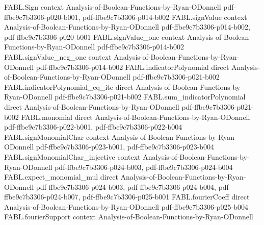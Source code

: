 \begin{theorem}
\label{FABL.variance_bounds_distanceToNearestConstant}
\leanok
{}
\proofstep
  {FABL.Sign}
  {context}
  {Analysis-of-Boolean-Functions-by-Ryan-ODonnell}
  {pdf-ffbe9c7b3306-p020-b001,
    pdf-ffbe9c7b3306-p014-b002}
\proofstep
  {FABL.signValue}
  {context}
  {Analysis-of-Boolean-Functions-by-Ryan-ODonnell}
  {pdf-ffbe9c7b3306-p014-b002,
    pdf-ffbe9c7b3306-p020-b001}
\proofstep
  {FABL.signValue_one}
  {context}
  {Analysis-of-Boolean-Functions-by-Ryan-ODonnell}
  {pdf-ffbe9c7b3306-p014-b002}
\proofstep
  {FABL.signValue_neg_one}
  {context}
  {Analysis-of-Boolean-Functions-by-Ryan-ODonnell}
  {pdf-ffbe9c7b3306-p014-b002}
\proofstep
  {FABL.indicatorPolynomial}
  {direct}
  {Analysis-of-Boolean-Functions-by-Ryan-ODonnell}
  {pdf-ffbe9c7b3306-p021-b002}
\proofstep
  {FABL.indicatorPolynomial_eq_ite}
  {direct}
  {Analysis-of-Boolean-Functions-by-Ryan-ODonnell}
  {pdf-ffbe9c7b3306-p021-b002}
\proofstep
  {FABL.sum_indicatorPolynomial}
  {direct}
  {Analysis-of-Boolean-Functions-by-Ryan-ODonnell}
  {pdf-ffbe9c7b3306-p021-b002}
\proofstep
  {FABL.monomial}
  {direct}
  {Analysis-of-Boolean-Functions-by-Ryan-ODonnell}
  {pdf-ffbe9c7b3306-p022-b001,
    pdf-ffbe9c7b3306-p022-b004}
\proofstep
  {FABL.signMonomialChar}
  {context}
  {Analysis-of-Boolean-Functions-by-Ryan-ODonnell}
  {pdf-ffbe9c7b3306-p023-b001,
    pdf-ffbe9c7b3306-p023-b004}
\proofstep
  {FABL.signMonomialChar_injective}
  {context}
  {Analysis-of-Boolean-Functions-by-Ryan-ODonnell}
  {pdf-ffbe9c7b3306-p024-b003,
    pdf-ffbe9c7b3306-p024-b004}
\proofstep
  {FABL.expect_monomial_mul}
  {direct}
  {Analysis-of-Boolean-Functions-by-Ryan-ODonnell}
  {pdf-ffbe9c7b3306-p024-b003,
    pdf-ffbe9c7b3306-p024-b004,
    pdf-ffbe9c7b3306-p024-b007,
    pdf-ffbe9c7b3306-p025-b001}
\proofstep
  {FABL.fourierCoeff}
  {direct}
  {Analysis-of-Boolean-Functions-by-Ryan-ODonnell}
  {pdf-ffbe9c7b3306-p025-b004}
\proofstep
  {FABL.fourierSupport}
  {context}
  {Analysis-of-Boolean-Functions-by-Ryan-ODonnell}

\end{theorem}
